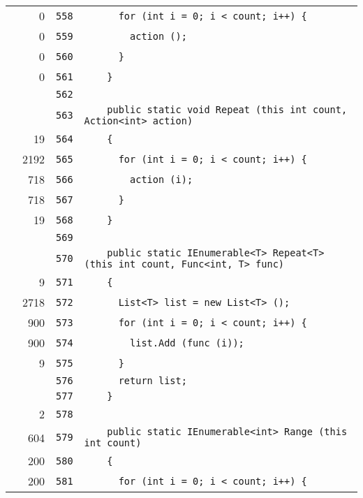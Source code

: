 \documentclass[a4paper,10pt]{article}
\begin{document}
\begin{longtable}[l]{lrrl}
\cellcolor{red} & 0 & \verb~558~ & \verb~      for (int i = 0; i < count; i++) {~\\
\cellcolor{red} & 0 & \verb~559~ & \verb~        action ();~\\
\cellcolor{red} & 0 & \verb~560~ & \verb~      }~\\
\cellcolor{red} & 0 & \verb~561~ & \verb~    }~\\
\cellcolor{gray} &  & \verb~562~ & \verb~~\\
\cellcolor{gray} &  & \verb~563~ & \verb~    public static void Repeat (this int count, Action<int> action)~\\
\cellcolor{green} & 19 & \verb~564~ & \verb~    {~\\
\cellcolor{green} & 2192 & \verb~565~ & \verb~      for (int i = 0; i < count; i++) {~\\
\cellcolor{green} & 718 & \verb~566~ & \verb~        action (i);~\\
\cellcolor{green} & 718 & \verb~567~ & \verb~      }~\\
\cellcolor{green} & 19 & \verb~568~ & \verb~    }~\\
\cellcolor{gray} &  & \verb~569~ & \verb~~\\
\cellcolor{gray} &  & \verb~570~ & \verb~    public static IEnumerable<T> Repeat<T> (this int count, Func<int, T> func)~\\
\cellcolor{green} & 9 & \verb~571~ & \verb~    {~\\
\cellcolor{green} & 2718 & \verb~572~ & \verb~      List<T> list = new List<T> ();~\\
\cellcolor{green} & 900 & \verb~573~ & \verb~      for (int i = 0; i < count; i++) {~\\
\cellcolor{green} & 900 & \verb~574~ & \verb~        list.Add (func (i));~\\
\cellcolor{green} & 9 & \verb~575~ & \verb~      }~\\
\cellcolor{gray} &  & \verb~576~ & \verb~      return list;~\\
\cellcolor{gray} &  & \verb~577~ & \verb~    }~\\
\cellcolor{green} & 2 & \verb~578~ & \verb~~\\
\cellcolor{green} & 604 & \verb~579~ & \verb~    public static IEnumerable<int> Range (this int count)~\\
\cellcolor{green} & 200 & \verb~580~ & \verb~    {~\\
\cellcolor{green} & 200 & \verb~581~ & \verb~      for (int i = 0; i < count; i++) {~\\

\end{longtable}
\end{document}
